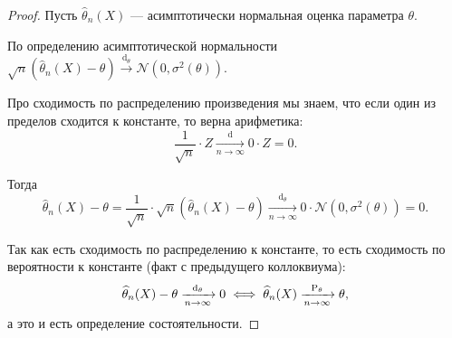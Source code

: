\begin{proof}
    Пусть $\widehat{\theta}_n(X)$ --- асимптотически нормальная оценка параметра $\theta$.

    По определению асимптотической нормальности $\sqrt{n} \left( \widehat{\theta}_n(X) - \theta \right) \xrightarrow[]{\operatorname{d}_{\theta}} \mathcal{N}(0, \sigma^2 (\theta))$.

    Про сходимость по распределению произведения мы знаем, что если один из пределов сходится к константе, то верна арифметика:
    \begin{equation*}
        \dfrac{1}{\sqrt{n}} \cdot Z \xrightarrow[n \to \infty]{\operatorname{d}} 0 \cdot Z = 0.
    \end{equation*}

    Тогда
    \begin{equation*}
        \widehat{\theta}_n(X) - \theta
        = \dfrac{1}{\sqrt{n}} \cdot \sqrt{n} \left( \widehat{\theta}_n(X) - \theta \right)
        \xrightarrow[n \to \infty]{\operatorname{d}_{\theta}} 
        0 \cdot \mathcal{N}(0, \sigma^2 (\theta))
        = 0.
    \end{equation*}

    Так как есть сходимость по распределению к константе, то есть сходимость по вероятности к константе (факт с предыдущего коллоквиума):
    \begin{equation*}
        \widehat{\theta}_n(X) - \theta
        \xrightarrow[n \to \infty]{\operatorname{d}_{\theta}} 
        0
        \iff 
        \widehat{\theta}_n(X)
        \xrightarrow[n \to \infty]{\P_{\theta}} \theta,
    \end{equation*}
    а это и есть определение состоятельности.
\end{proof}